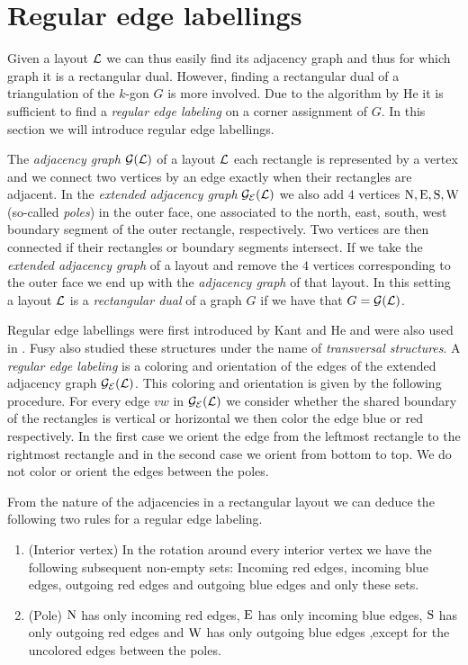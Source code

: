 
\section{Regular edge labellings}
\thispagestyle{plain}
  Given a layout $\mathcal{L}$ we can thus easily find its adjacency graph and thus for which graph it is a rectangular dual. However, finding a rectangular dual of a triangulation of the $k$-gon $G$ is more involved. Due to the algorithm by He \cite{He1993} it is sufficient to find a \emph{regular edge labeling} on a corner assignment of $G$. In this section we will introduce regular edge labellings.

  The \emph{ adjacency graph} $\mathcal{G}(\mathcal{L})$ of a layout $\mathcal{L}$ each rectangle is represented by a vertex and we connect two vertices by an edge exactly when their rectangles are adjacent. In the \emph{extended adjacency graph} $\mathcal{G}_{\mathcal{E}}(\mathcal{L})$ we also add $4$ vertices $\mathrm{N}, \mathrm{E}, \mathrm{S}, \mathrm{W}$ (so-called \emph{poles}) in the outer face, one associated to the north, east, south, west boundary segment of the outer rectangle, respectively. Two vertices are then connected if their rectangles or boundary segments intersect.
  If we take the \emph{extended adjacency graph} of a layout and remove the $4$ vertices corresponding to the outer face we end up with the \emph{adjacency graph} of that layout.
  In this setting a layout $\mathcal{L}$ is a \emph{rectangular dual} of a graph $G$ if we have that $G = \mathcal{G}(\mathcal{L})$.


  Regular edge labellings were first introduced by Kant and He \cite{Kant1997} and were also used in \cite{Eppstein2012}. Fusy also studied these structures \cite{Fusy2006,Fusy2009} under the name of \emph{transversal structures}.
  A \emph{regular edge labeling} is a coloring and orientation of the edges of the extended adjacency graph $\mathcal{G}_{\mathcal{E}}(\mathcal{L})$. This coloring and orientation is given by the following procedure. For every edge $vw$ in $\mathcal{G}_{\mathcal{E}}(\mathcal{L})$ we consider whether the shared boundary of the rectangles is vertical or horizontal we then color the edge blue or red respectively. In the first case we orient the edge from the leftmost rectangle to the rightmost rectangle and in the second case we orient from bottom to top. We do not color or orient the edges between the poles.

  From the nature of the adjacencies in a rectangular layout we can deduce the following two rules for a regular edge labeling.
  \begin{enumerate}
    \item (Interior vertex) In the rotation around every interior vertex we have the following subsequent non-empty sets: Incoming red edges, incoming blue edges, outgoing red edges and outgoing blue edges and only these sets.
    \item (Pole) $\mathrm{N}$ has only incoming red edges, $\mathrm{E}$ has only incoming blue edges, $\mathrm{S}$ has only outgoing red edges and $\mathrm{W}$ has only outgoing blue edges ,except for the uncolored edges between the poles.
  \end{enumerate}

